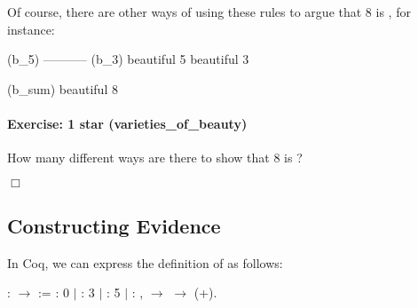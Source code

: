 \documentclass[12pt]{report}
\begin{document}
\subsubsection{ }



    Of course, there are other ways of using these rules to argue that
    8 is , for instance:
\par
\noindent\hrulefill\par
\noindent{} (b\_5)   ----------- (b\_3)
         beautiful 5         beautiful 3
\par
\noindent\hrulefill\par
\noindent{} (b\_sum)
                   beautiful 8   


\paragraph{Exercise: 1 star (varieties\_of\_beauty)}

 How many different ways are there to show that 8 is ? \begin{coqdoccode}
\coqdocemptyline
\end{coqdoccode}
\ensuremath{\Box} \begin{coqdoccode}
\coqdocemptyline
\end{coqdoccode}
\subsection{Constructing Evidence}



 In Coq, we can express the definition of  as
    follows: \begin{coqdoccode}
\coqdocemptyline
\coqdocnoindent
{}  :  \ensuremath{\rightarrow}  :=\coqdoceol
\coqdocindent{1.00em}
   :  0\coqdoceol
\coqdocnoindent
\ensuremath{|}    :  3\coqdoceol
\coqdocnoindent
\ensuremath{|}    :  5\coqdoceol
\coqdocnoindent
\ensuremath{|}  : \coqdockw{\ensuremath{\forall}}  ,   \ensuremath{\rightarrow}   \ensuremath{\rightarrow}  (+).\coqdoceol
\coqdocemptyline
\end{coqdoccode}
\subsubsection{ }
\end{document}
